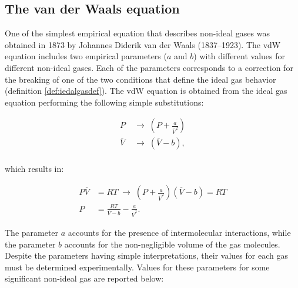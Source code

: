 \documentclass[
  9pt,
]{extbook}
\theoremstyle{definition}
\theoremstyle{definition}
\theoremstyle{definition}
\theoremstyle{remark}
\begin{document}
\hypertarget{the-van-der-waals-equation}{%
\subsection{The van der Waals equation}\label{the-van-der-waals-equation}}

One of the simplest empirical equation that describes non-ideal gases was obtained in 1873 by Johannes Diderik van der Waals (1837--1923). The vdW equation includes two empirical parameters (\(a\) and \(b\)) with different values for different non-ideal gases. Each of the parameters corresponds to a correction for the breaking of one of the two conditions that define the ideal gas behavior (definition \ref{def:iedalgasdef}). The vdW equation is obtained from the ideal gas equation performing the following simple substitutions:

\begin{equation}
\begin{aligned}
P & \;\rightarrow\;\left( P + \frac{a}{\overline{V}^2} \right)\\
\overline{V} & \;\rightarrow\;\left( \overline{V} - b\right),\\
\end{aligned}
\label{eq:vdWeq1}
\end{equation}

which results in:

\begin{equation}
\begin{aligned}
P\overline{V} &=RT \; \rightarrow \; \left( P + \frac{a}{\overline{V}^2} \right)\left( \overline{V} - b\right)=RT\\
P &=\frac{RT}{\overline{V} - b}-\frac{a}{\overline{V}^2}.
\end{aligned}
\label{eq:vdWeq2}
\end{equation}

The parameter \(a\) accounts for the presence of intermolecular interactions, while the parameter \(b\) accounts for the non-negligible volume of the gas molecules. Despite the parameters having simple interpretations, their values for each gas must be determined experimentally. Values for these parameters for some significant non-ideal gas are reported below:

\scriptsize
\end{document}

